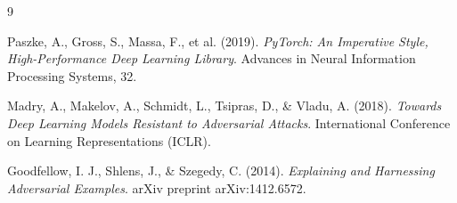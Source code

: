 \begin{thebibliography}{9}

Paszke, A., Gross, S., Massa, F., et al. (2019). \textit{PyTorch: An Imperative Style, High-Performance Deep Learning Library}. Advances in Neural Information Processing Systems, 32.

Madry, A., Makelov, A., Schmidt, L., Tsipras, D., \& Vladu, A. (2018). \textit{Towards Deep Learning Models Resistant to Adversarial Attacks}. International Conference on Learning Representations (ICLR).

Goodfellow, I. J., Shlens, J., \& Szegedy, C. (2014). \textit{Explaining and Harnessing Adversarial Examples}. arXiv preprint arXiv:1412.6572.

\end{thebibliography}
